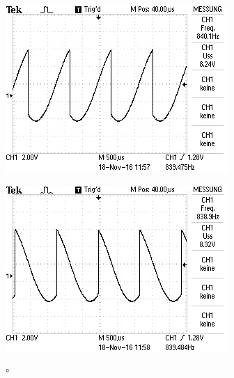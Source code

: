 \begin{figure}[!h]
\begin{minipage}[t]{0.3\textwidth}
    \caption{\si{\degree}}
  \end{minipage}
  \begin{minipage}[t]{0.3\textwidth}
    \includegraphics[width=\textwidth]{Bilder/225.jpeg}
    \label{fig:255}
    \caption{\si{\degree}}
  \end{minipage}
  \begin{minipage}[t]{0.3\textwidth}
    \includegraphics[width=\textwidth]{Bilder/330.jpeg}
    \label{fig:330}
    \caption{\si{\degree}}
  \end{minipage}
\end{figure}
